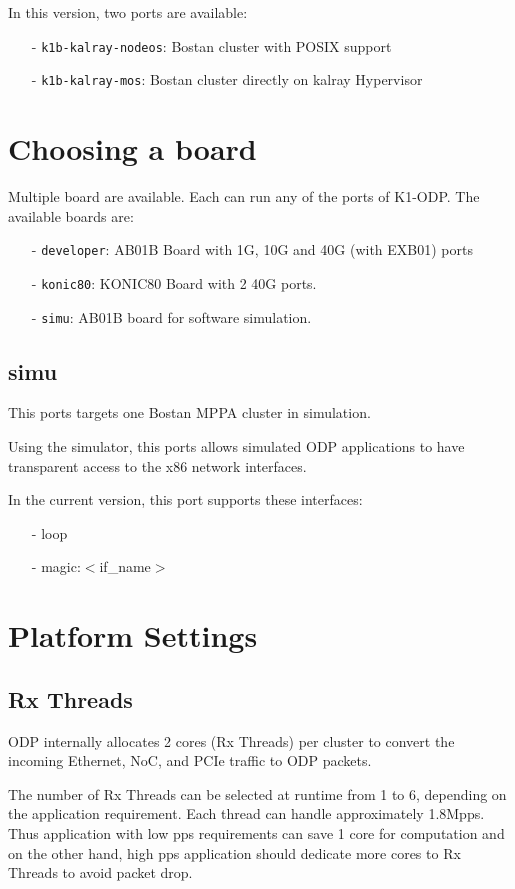\documentclass{trkalray}
\begin{document}
In this version, two ports are available:
\begin{itemize}
\item[-]{\texttt{k1b-kalray-nodeos}: Bostan cluster with POSIX support}
\item[-]{\texttt{k1b-kalray-mos}: Bostan cluster directly on kalray Hypervisor}
\end{itemize}

\section{Choosing a board}

Multiple board are available. Each can run any of the ports of K1-ODP.
The available boards are:
\begin{itemize}
\item[-]{\texttt{developer}: AB01B Board with 1G, 10G and 40G (with EXB01) ports }
\item[-]{\texttt{konic80}: KONIC80 Board with 2 40G ports.}
\item[-]{\texttt{simu}: AB01B board for software simulation.}
\end{itemize}

\subsection{simu}

This ports targets one Bostan MPPA cluster in simulation.

Using the simulator, this ports allows simulated ODP applications to
have transparent access to the x86 network interfaces.

In the current version, this port supports these interfaces:
\begin{itemize}
\item[-]{loop}
\item[-]{magic:$<$if\_name$>$}
\end{itemize}

\section{Platform Settings}
\subsection{Rx Threads}
ODP internally allocates 2 cores (Rx Threads) per cluster to convert the incoming
Ethernet, NoC, and PCIe traffic to ODP packets.

The number of Rx Threads can be selected at runtime from 1 to 6,
depending on the application requirement. Each thread can handle
approximately 1.8Mpps. Thus application with low pps requirements can
save 1 core for computation and on the other hand, high pps
application should dedicate more cores to Rx Threads to avoid packet
drop.
\end{document}
